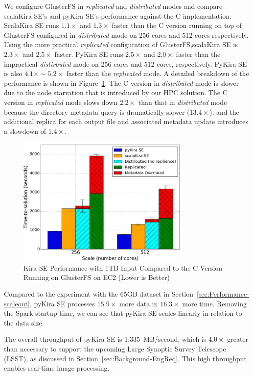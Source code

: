 \documentclass[10pt,journal,compsoc]{IEEEtran}
\begin{document}
We configure GlusterFS in \emph{replicated} and \emph{distributed} modes and compare scalaKira
SE's and pyKira SE's performance against the C implementation. 
ScalaKira SE runs $1.1\times$ and $1.3\times$ faster than the C version running on top of
GlusterFS configured in \emph{distributed} mode on 256 cores and 512 cores respectively. 
Using the more practical \emph{replicated} configuration of GlusterFS,scalaKira SE is $2.3\times$ and $2.5\times$ faster. 
PyKira SE runs $2.5\times$ and $2.0\times$ faster than the impractical \emph{distirbuted} mode on 256 cores and 512 cores, respectively.
PyKira SE is also $4.1\times\sim5.2\times$ faster than the \emph{replicated} mode.
A detailed breakdown of the performance is shown in Figure~\ref{fig:1tb-ec2}.
The C version in \emph{distributed} mode is slower due to the node starvation that is introduced by our HPC solution.
The C version in \emph{replicated} mode slows down $2.2\times$ than that in \emph{distributed} mode because the directory metadata query
is dramatically slower ($13.4\times$), and the additional replica for each output file and associated metadata update introduces a slowdown
of $1.4\times$.


\begin{figure}[t]
	\begin{center}
		\includegraphics[width=85mm]{pictures/1TB-EC2}
		\caption{Kira SE Performance with 1TB Input Compared to the C Version Running on GlusterFS on EC2 (Lower is Better)
		\label{fig:1tb-ec2}}
  	\end{center}
\end{figure}

Compared to the experiment with the 65GB dataset in Section~\ref{sec:Performance-scaleout},
pyKira SE processes $15.9\times$ more data in $16.3\times$ more time. Removing the Spark
startup time, we can see that pyKira SE scales linearly in relation to the data size.

The overall throughput of pyKira SE is 1,335~MB/second, which is $4.0\times$ greater than necessary
to support the upcoming Large Synoptic Survey Telescope (LSST), as discussed in
Section~\ref{sec:Background-EngReq}. This high throughput enables real-time image processing.
\end{document}

